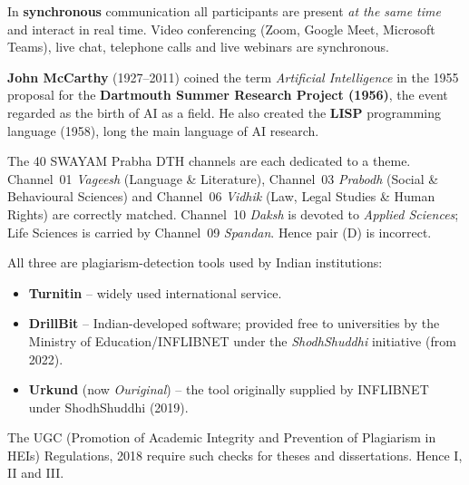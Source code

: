 In \textbf{synchronous} communication all participants are present \emph{at the same time} and interact in real time. Video conferencing (Zoom, Google Meet, Microsoft Teams), live chat, telephone calls and live webinars are synchronous.

\textbf{John McCarthy} (1927--2011) coined the term \emph{Artificial Intelligence} in the 1955 proposal for the \textbf{Dartmouth Summer Research Project (1956)}, the event regarded as the birth of AI as a field. He also created the \textbf{LISP} programming language (1958), long the main language of AI research.

The 40 SWAYAM Prabha DTH channels are each dedicated to a theme. Channel~01 \emph{Vageesh} (Language \& Literature), Channel~03 \emph{Prabodh} (Social \& Behavioural Sciences) and Channel~06 \emph{Vidhik} (Law, Legal Studies \& Human Rights) are correctly matched. Channel~10 \emph{Daksh} is devoted to \emph{Applied Sciences}; Life Sciences is carried by Channel~09 \emph{Spandan}. Hence pair (D) is incorrect.

All three are plagiarism-detection tools used by Indian institutions:
\begin{itemize}
\item \textbf{Turnitin} -- widely used international service.
\item \textbf{DrillBit} -- Indian-developed software; provided free to universities by the Ministry of Education/INFLIBNET under the \emph{ShodhShuddhi} initiative (from 2022).
\item \textbf{Urkund} (now \emph{Ouriginal}) -- the tool originally supplied by INFLIBNET under ShodhShuddhi (2019).
\end{itemize}
The UGC (Promotion of Academic Integrity and Prevention of Plagiarism in HEIs) Regulations, 2018 require such checks for theses and dissertations. Hence I, II and III.

